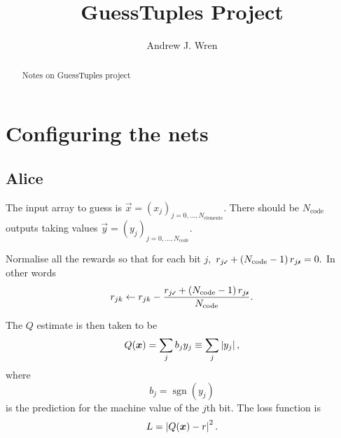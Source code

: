 \documentclass[12pt]{article}
\title{GuessTuples Project}
\author{Andrew J. Wren}
\begin{document}
\maketitle

\begin{abstract}
	Notes on GuessTuples project
\end{abstract}


\section{Configuring the nets}

\subsection{Alice}

The input array to guess is $\vec{x}=(x_j)_{j=0,...,N_\text{elements}}.$  There should be $N_\text{code}$ outputs taking values $\vec{y} = (y_j)_{j=0,...,N_\text{code}}.$

Normalise all the rewards so that for each bit $j,$ $\rt{j} + \left(N_\text{code} - 1\right)\rf{j} = 0.$  In other words
\begin{equation}
	r_{jk}
	\gets
	r_{jk} - \frac{ \rt{j} + \left(N_\text{code} - 1\right)\rf{j}}{N_\text{code}}
	.
\end{equation}

The $Q$ estimate is then taken to be
\begin{equation}
	Q(\boldsymbol{x})
	=
	\sum_j b_j y_j
	\equiv
	\sum_j \left\lvert y_j \right\rvert
	,		
\end{equation}
where
\begin{equation}
	b_j = \operatorname{sgn} (y_j)
\end{equation}
is the prediction for the machine value of the $j$th bit.  The loss function is
\begin{equation}
	L
	=
	\left\lvert Q(\boldsymbol{x}) -r \right\rvert^2
	. 
\end{equation}
\end{document}
